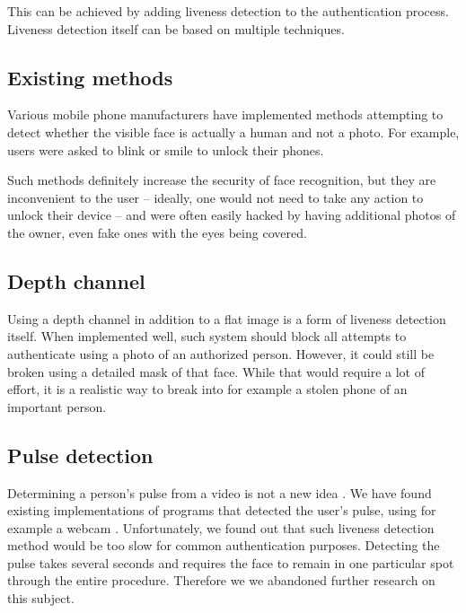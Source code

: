         This can be achieved by adding liveness detection to the authentication
        process. Liveness detection itself can be based on multiple techniques.

        \subsection*{Existing methods}
            Various mobile phone manufacturers have implemented methods attempting to
            detect whether the visible face is actually a human and not a photo.
            For example, users were asked to blink or smile to unlock their phones.

            Such methods definitely increase the security of face recognition,
            but they are inconvenient to the user -- ideally, one would not need to take
            any action to unlock their device -- and were often easily hacked by having
            additional photos of the owner, even fake ones with the eyes being covered.

        \subsection*{Depth channel}
            Using a depth channel in addition to a flat image is a form of liveness
            detection itself.
            When implemented well, such system should block all attempts to authenticate
            using a photo of an authorized person.
            However, it could still be broken using a detailed mask of that face.
            While that would require a lot of effort, it is a realistic way to break
            into for example a stolen phone of an important person.

        \subsection*{Pulse detection}
            Determining a person's pulse from a video is not a new idea \cite{mkinectheart}.
            We have found existing implementations of programs that detected the user's
            pulse, using for example a webcam \cite{pulsedetector}.
            Unfortunately, we found out that such liveness detection method would be
            too slow for common authentication purposes.
            Detecting the pulse takes several seconds and requires the face to remain
            in one particular spot through the entire procedure.
            Therefore we we abandoned further research on this subject.

